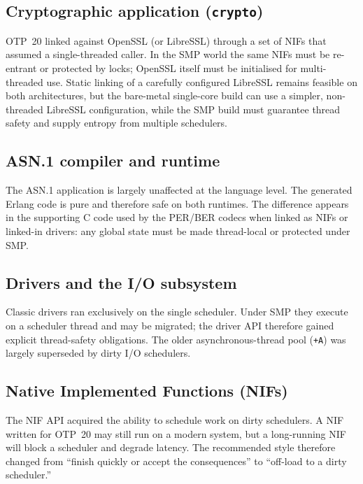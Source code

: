 \documentclass{article}
\begin{document}
\subsection{Cryptographic application (\texttt{crypto})}

OTP~20 linked against OpenSSL (or LibreSSL) through a set of NIFs that assumed a single-threaded caller.
In the SMP world the same NIFs must be re-entrant or protected by locks; OpenSSL itself must be initialised for multi-threaded use.
Static linking of a carefully configured LibreSSL remains feasible on both architectures, but the bare-metal single-core build can use a simpler, non-threaded LibreSSL configuration, while the SMP build must guarantee thread safety and supply entropy from multiple schedulers.

\subsection{ASN.1 compiler and runtime}

The ASN.1 application is largely unaffected at the language level.
The generated Erlang code is pure and therefore safe on both runtimes.
The difference appears in the supporting C code used by the PER/BER codecs when linked as NIFs or linked-in drivers: any global state must be made thread-local or protected under SMP.

\subsection{Drivers and the I/O subsystem}

Classic drivers ran exclusively on the single scheduler.
Under SMP they execute on a scheduler thread and may be migrated; the driver API therefore gained explicit thread-safety obligations.
The older asynchronous-thread pool (\texttt{+A}) was largely superseded by dirty I/O schedulers.

\subsection{Native Implemented Functions (NIFs)}

The NIF API acquired the ability to schedule work on dirty schedulers.
A NIF written for OTP~20 may still run on a modern system, but a long-running NIF will block a scheduler and degrade latency.
The recommended style therefore changed from ``finish quickly or accept the consequences'' to ``off-load to a dirty scheduler.''
\end{document}
